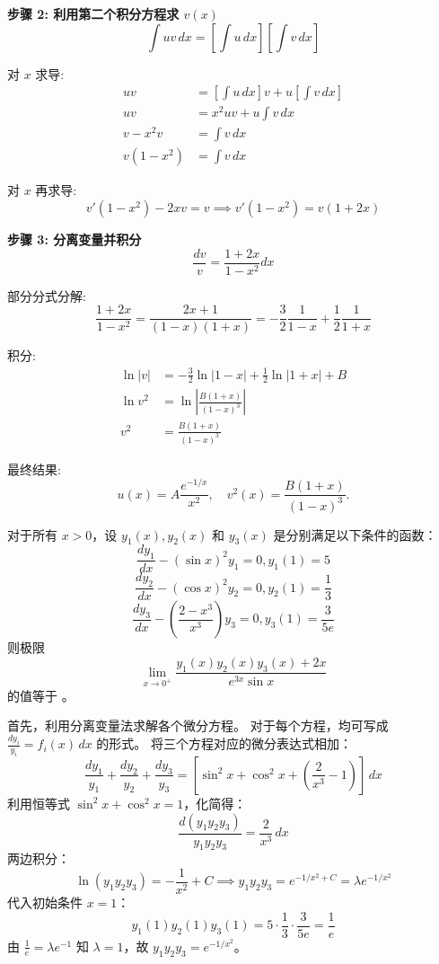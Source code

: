 \begin{questions}
\begin{solution}
\textbf{步骤 2: 利用第二个积分方程求 $v(x)$}
\[
\int uv \, dx = \left[\int u \, dx\right] \left[\int v \, dx\right]
\]

对 $x$ 求导:
\begin{align*}
uv &= \left[\int u \, dx\right] v + u \left[\int v \, dx\right] \\
uv &= x^2 u v + u \int v \, dx \\
v - x^2 v &= \int v \, dx \\
v(1-x^2) &= \int v \, dx
\end{align*}

对 $x$ 再求导:
\[
v'(1-x^2) - 2x v = v \implies v'(1-x^2) = v(1+2x)
\]

\textbf{步骤 3: 分离变量并积分}
\[
\frac{dv}{v} = \frac{1+2x}{1-x^2} dx
\]

部分分式分解:
\[
\frac{1+2x}{1-x^2} = \frac{2x+1}{(1-x)(1+x)} = -\frac{3}{2}\frac{1}{1-x} + \frac{1}{2}\frac{1}{1+x}
\]

积分:
\begin{align*}
\ln|v| &= -\frac{3}{2}\ln|1-x| + \frac{1}{2}\ln|1+x| + B \\
\ln v^2 &= \ln \left| \frac{B(1+x)}{(1-x)^3} \right| \\
v^2 &= \frac{B(1+x)}{(1-x)^3}
\end{align*}

最终结果:
\[
u(x) = A \frac{e^{-1/x}}{x^2}, \quad v^2(x) = \frac{B(1+x)}{(1-x)^3}.
\]

\end{solution}


\question
对于所有 $x > 0$，设 $y_1(x), y_2(x)$ 和 $y_3(x)$ 是分别满足以下条件的函数：
\[ \frac{dy_1}{dx} - (\sin x)^2 y_1 = 0, y_1(1) = 5 \]
\[ \frac{dy_2}{dx} - (\cos x)^2 y_2 = 0, y_2(1) = \frac{1}{3} \]
\[ \frac{dy_3}{dx} - \left( \frac{2 - x^3}{x^3} \right) y_3 = 0, y_3(1) = \frac{3}{5e} \]
则极限
\[ \lim_{x \to 0^+} \frac{y_1(x)y_2(x)y_3(x) + 2x}{e^{3x} \sin x} \]
的值等于 \underline{\hspace{2cm}}。

\begin{solution}
    首先，利用分离变量法求解各个微分方程。
    对于每个方程，均可写成 $\frac{dy_i}{y_i} = f_i(x) \,dx$ 的形式。
    将三个方程对应的微分表达式相加：
    \[
    \frac{dy_1}{y_1} + \frac{dy_2}{y_2} + \frac{dy_3}{y_3} = \left[ \sin^2 x + \cos^2 x + \left( \frac{2}{x^3} - 1 \right) \right] \,dx
    \]
    利用恒等式 $\sin^2 x + \cos^2 x = 1$，化简得：
    \[
    \frac{d(y_1 y_2 y_3)}{y_1 y_2 y_3} = \frac{2}{x^3} \,dx
    \]
    两边积分：
    \[
    \ln(y_1 y_2 y_3) = -\frac{1}{x^2} + C \implies y_1 y_2 y_3 = e^{-1/x^2 + C} = \lambda e^{-1/x^2}
    \]
    代入初始条件 $x=1$：
    \[
    y_1(1)y_2(1)y_3(1) = 5 \cdot \frac{1}{3} \cdot \frac{3}{5e} = \frac{1}{e}
    \]
    由 $\frac{1}{e} = \lambda e^{-1}$ 知 $\lambda = 1$，故 $y_1 y_2 y_3 = e^{-1/x^2}$。


\end{solution}
\end{questions}
